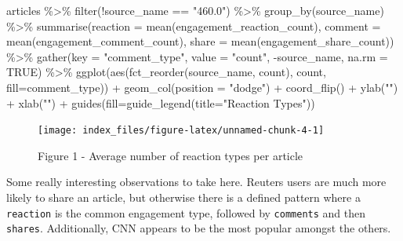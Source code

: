 \documentclass[
]{article}
\newenvironment{Shaded}{\begin{snugshade}}{\end{snugshade}}
\newcommand{\AttributeTok}[1]{\textcolor[rgb]{0.77,0.63,0.00}{#1}}
\newcommand{\ConstantTok}[1]{\textcolor[rgb]{0.00,0.00,0.00}{#1}}
\newcommand{\FunctionTok}[1]{\textcolor[rgb]{0.00,0.00,0.00}{#1}}
\newcommand{\NormalTok}[1]{#1}
\newcommand{\SpecialCharTok}[1]{\textcolor[rgb]{0.00,0.00,0.00}{#1}}
\newcommand{\StringTok}[1]{\textcolor[rgb]{0.31,0.60,0.02}{#1}}
\begin{document}
\begin{Shaded}
\begin{Highlighting}[]
\NormalTok{articles }\SpecialCharTok{\%\textgreater{}\%}
 \FunctionTok{filter}\NormalTok{(}\SpecialCharTok{!}\NormalTok{source\_name }\SpecialCharTok{==} \StringTok{"460.0"}\NormalTok{) }\SpecialCharTok{\%\textgreater{}\%}
 \FunctionTok{group\_by}\NormalTok{(source\_name) }\SpecialCharTok{\%\textgreater{}\%}
 \FunctionTok{summarise}\NormalTok{(}\AttributeTok{reaction =} \FunctionTok{mean}\NormalTok{(engagement\_reaction\_count),}
            \AttributeTok{comment =} \FunctionTok{mean}\NormalTok{(engagement\_comment\_count),}
              \AttributeTok{share =} \FunctionTok{mean}\NormalTok{(engagement\_share\_count)) }\SpecialCharTok{\%\textgreater{}\%}
 \FunctionTok{gather}\NormalTok{(}\AttributeTok{key =} \StringTok{"comment\_type"}\NormalTok{, }\AttributeTok{value =} \StringTok{"count"}\NormalTok{, }\SpecialCharTok{{-}}\NormalTok{source\_name, }\AttributeTok{na.rm =} \ConstantTok{TRUE}\NormalTok{) }\SpecialCharTok{\%\textgreater{}\%}
 \FunctionTok{ggplot}\NormalTok{(}\FunctionTok{aes}\NormalTok{(}\FunctionTok{fct\_reorder}\NormalTok{(source\_name, count), count, }\AttributeTok{fill=}\NormalTok{comment\_type)) }\SpecialCharTok{+} 
 \FunctionTok{geom\_col}\NormalTok{(}\AttributeTok{position =} \StringTok{"dodge"}\NormalTok{) }\SpecialCharTok{+} 
 \FunctionTok{coord\_flip}\NormalTok{() }\SpecialCharTok{+}
 \FunctionTok{ylab}\NormalTok{(}\StringTok{""}\NormalTok{) }\SpecialCharTok{+} 
 \FunctionTok{xlab}\NormalTok{(}\StringTok{""}\NormalTok{) }\SpecialCharTok{+} 
 \FunctionTok{guides}\NormalTok{(}\AttributeTok{fill=}\FunctionTok{guide\_legend}\NormalTok{(}\AttributeTok{title=}\StringTok{"Reaction Types"}\NormalTok{))}
\end{Highlighting}
\end{Shaded}

\begin{figure}

{\centering \texttt{[image: index\_files/figure-latex/unnamed-chunk-4-1]} 

}

\caption{Figure 1 - Average number of reaction types per article}\label{fig:unnamed-chunk-4}
\end{figure}

Some really interesting observations to take here. Reuters users are
much more likely to share an article, but otherwise there is a defined
pattern where a \texttt{reaction} is the common engagement type,
followed by \texttt{comments} and then \texttt{shares}. Additionally,
CNN appears to be the most popular amongst the others.
\end{document}

